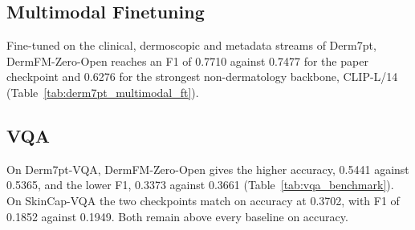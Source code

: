 \documentclass{article}
\begin{document}
\subsection{Multimodal Finetuning}

Fine-tuned on the clinical, dermoscopic and metadata streams of Derm7pt, DermFM-Zero-Open reaches an F1 of 0.7710 against 0.7477 for the paper checkpoint and 0.6276 for the strongest non-dermatology backbone, CLIP-L/14 (Table~\ref{tab:derm7pt_multimodal_ft}).

\begin{table}[H]
\centering
{}
\caption{Multimodal finetuning on Derm7pt (F1 score).}
\label{tab:derm7pt_multimodal_ft}
\end{table}

\subsection{VQA}

On Derm7pt-VQA, DermFM-Zero-Open gives the higher accuracy, 0.5441 against 0.5365, and the lower F1, 0.3373 against 0.3661 (Table~\ref{tab:vqa_benchmark}). On SkinCap-VQA the two checkpoints match on accuracy at 0.3702, with F1 of 0.1852 against 0.1949. Both remain above every baseline on accuracy.
\end{document}
